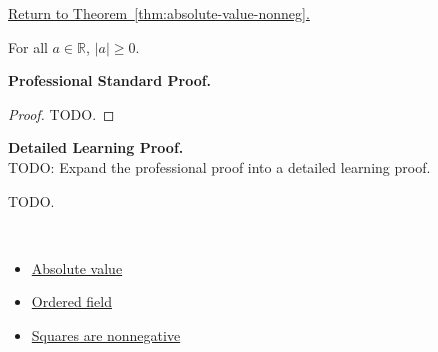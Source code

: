 \newpage
{}
\label{prf:absolute-value-nonneg}

\begin{remark*}[Return]
\hyperref[thm:absolute-value-nonneg]{Return to Theorem~\ref*{thm:absolute-value-nonneg}.}
\end{remark*}

\begin{theorem*}
For all $a \in \mathbb{R}$, $\lvert a \rvert \ge 0$.
\end{theorem*}

\textbf{Professional Standard Proof.}~\\
\begin{proof}
TODO.
\end{proof}

\textbf{Detailed Learning Proof.}~\\
TODO: Expand the professional proof into a detailed learning proof.


\begin{remark*}
TODO.
\end{remark*}

\begin{remark*}[Dependencies]~\\
\begin{itemize}
  \item \hyperref[def:absolute-value]{Absolute value}
  \item \hyperref[def:ordered-field]{Ordered field}
  \item \hyperref[thm:squares-nonnegative]{Squares are nonnegative}
\end{itemize}
\end{remark*}
